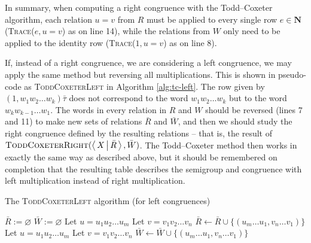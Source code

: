 In summary, when computing a right congruence with the Todd--Coxeter algorithm, each relation
$u=v$ from $R$ must be applied to every single row $e \in \mathbf{N}$
(\textsc{Trace($e, u=v$)} as on line 14), while the relations from $W$ only need to be applied
to the identity row (\textsc{Trace($1, u=v$)} as on line 8).

If, instead of a right congruence, we are considering a left congruence, we may
apply the same method but reversing all multiplications.
This is shown in pseudo-code as \textsc{ToddCoxeterLeft} in Algorithm
\ref{alg:tc-left}.  The
row given by $(1, w_1 w_2 \ldots w_k)\bar\tau$ does not correspond to the word
$w_1 w_2 \ldots w_k$ but to the word $w_k w_{k-1} \ldots w_1$.  The words in
every relation in $R$ and $W$ should be reversed (lines 7 and 11) to make new
sets of relations $\bar R$ and $\bar W$, and then we should study the
right congruence defined by the resulting relations -- that is, the result of
$\textsc{ToddCoxeterRight}(\left\langle \, X \, \middle| \, \bar R \, \right\rangle, \bar W)$.  The Todd--Coxeter method
then works in exactly the same way as described above, but it should be
remembered on completion that the resulting table describes the semigroup and
congruence with left multiplication instead of right multiplication.

\begin{algorithm}
\caption{The \textsc{ToddCoxeterLeft} algorithm (for left congruences)}
\label{alg:tc-left}
\begin{algorithmic}[1]
\State $\bar R := \varnothing$
\State $\bar W := \varnothing$
  \State Let $u = u_1 u_2 \ldots u_m$ 
  \State Let $v = v_1 v_2 \ldots v_n$ 
  \State $\bar R \gets \bar R \cup \{(u_m \ldots u_1, v_n \ldots v_1)\}$
\EndFor
{}
  \State Let $u = u_1 u_2 \ldots u_m$ 
  \State Let $v = v_1 v_2 \ldots v_n$ 
  \State $\bar W \gets \bar W \cup \{(u_m \ldots u_1, v_n \ldots v_1)\}$
\EndFor
\State \Return {}
\EndProcedure
\end{algorithmic}
\end{algorithm}

